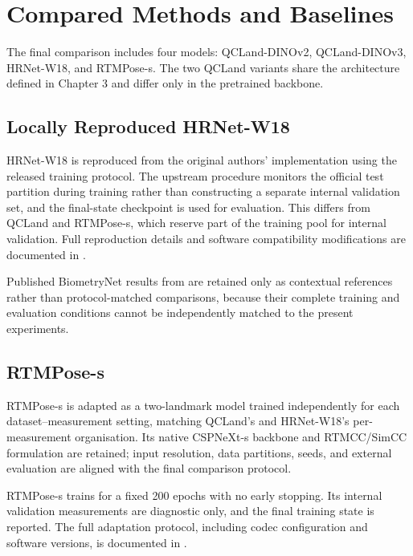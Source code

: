 
\section{Compared Methods and Baselines}
\label{sec:setup-baselines}

The final comparison includes four models: QCLand-DINOv2,
QCLand-DINOv3, HRNet-W18, and RTMPose-s. The two QCLand variants
share the architecture defined in Chapter 3 and differ only in the
pretrained backbone.


\subsection{Locally Reproduced HRNet-W18}

HRNet-W18 is reproduced from the original authors' implementation
using the released training protocol. The upstream procedure monitors
the official test partition during training rather than constructing
a separate internal validation set, and the final-state checkpoint is
used for evaluation. This differs from QCLand and RTMPose-s, which
reserve part of the training pool for internal validation. Full
reproduction details and software compatibility modifications are
documented in .

Published BiometryNet results from
\textcite{divece2025multicentre} are retained only as contextual
references rather than protocol-matched comparisons, because their
complete training and evaluation conditions cannot be independently
matched to the present experiments.


\subsection{RTMPose-s}
\label{sec:setup-rtmpose}

RTMPose-s \parencite{jiang2023rtmpose} is adapted as a two-landmark
model trained independently for each dataset--measurement setting,
matching QCLand's and HRNet-W18's per-measurement organisation. Its
native CSPNeXt-s backbone and RTMCC/SimCC formulation are retained;
input resolution, data partitions, seeds, and external evaluation
are aligned with the final comparison protocol.

RTMPose-s trains for a fixed 200 epochs with no early stopping.
Its internal validation measurements are diagnostic only, and the
final training state is reported. The full adaptation protocol,
including codec configuration and software versions, is documented
in .


